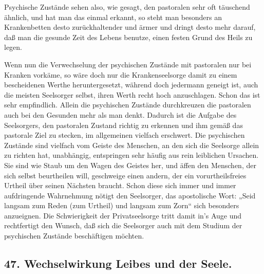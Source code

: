 Psychische Zustände sehen also, wie gesagt, den pastoralen sehr oft täuschend ähnlich, und hat man das einmal erkannt, so steht man besonders an Krankenbetten desto zurückhaltender und ärmer und dringt desto mehr darauf, daß man die gesunde Zeit des Lebens benutze, einen festen Grund des Heils zu legen.

Wenn nun die Verwechselung der psychischen Zustände mit pastoralen nur bei Kranken vorkäme, so wäre doch nur die Krankenseelsorge damit zu einem bescheidenen Werthe heruntergesetzt, während doch jedermann geneigt ist, auch die meisten Seelsorger selbst, ihren Werth recht hoch anzuschlagen. Schon das ist sehr empfindlich. Allein die psychischen Zustände durchkreuzen die pastoralen auch bei den Gesunden mehr als man denkt. Dadurch ist die Aufgabe des Seelsorgers, den pastoralen Zustand richtig zu erkennen und ihm gemäß das pastorale Ziel zu stecken, im allgemeinen vielfach erschwert. Die psychischen Zustände sind vielfach vom Geiste des Menschen, an den sich die Seelsorge allein zu richten hat, unabhängig, entspringen sehr häufig aus rein leiblichen Ursachen. Sie sind wie Staub um den Wagen des Geistes her, und äffen den Menschen, der sich selbst beurtheilen will, geschweige einen andern, der ein vorurtheilsfreies Urtheil über seinen
Nächsten braucht. Schon diese sich immer und immer aufdringende Wahrnehmung nötigt den Seelsorger, das apostolische Wort: „Seid langsam zum Reden (zum Urtheil) und langsam zum Zorn“ sich besonders anzueignen. Die Schwierigkeit der Privatseelsorge tritt damit in’s Auge und rechtfertigt den Wunsch, daß sich die Seelsorger auch mit dem Studium der psychischen Zustände beschäftigen möchten.

\subsection*{47. Wechselwirkung Leibes und der Seele.}


